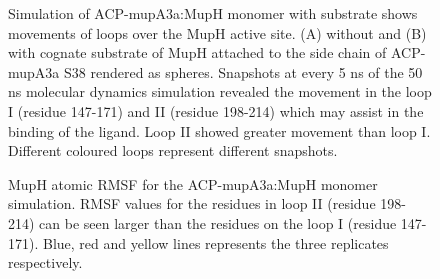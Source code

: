 		\setlength\fboxsep{5pt}
		\setlength\fboxrule{1.5pt}
		\begin{figure}[htbp]
		\centering
		\caption[Simulation of ACP-mupA3a:MupH monomer with substrate shows movements of loops over the MupH active site.]{Simulation of ACP-mupA3a:MupH monomer with substrate shows movements of loops over the MupH active site. (A) without and (B) with cognate substrate of MupH attached to the side chain of ACP-mupA3a S38 rendered as spheres. Snapshots at every 5 ns of the 50 ns molecular dynamics simulation revealed the movement in the loop I (residue 147-171) and II (residue 198-214) which may assist in the binding of the ligand. Loop II showed greater movement than loop I. Different coloured loops represent different snapshots. }
		\label{fig:muphAligned}
		\end{figure}	
		
		\setlength\fboxsep{5pt}
		\setlength\fboxrule{1.5pt}
		\begin{figure}[htbp]
		\centering
		\caption[MupH atomic RMSF for the ACP-mupA3a:MupH monomer simulation.]{MupH atomic RMSF for the ACP-mupA3a:MupH monomer simulation. RMSF values for the residues in loop II (residue 198-214) can be seen larger than the residues on the loop I (residue 147-171). Blue, red and yellow lines represents the three replicates respectively.}
		\label{fig:acpMuphMonomerRmsf}
		\end{figure}					

